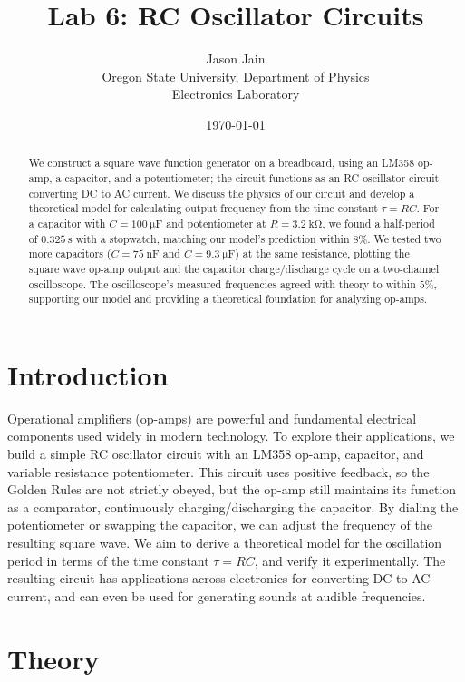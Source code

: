\documentclass[11pt]{article}
\title{Lab 6: RC Oscillator Circuits}
\author{Jason Jain \\
        Oregon State University, Department of Physics \\
        Electronics Laboratory}
\date{\today}
\begin{document}
\maketitle


\begin{abstract}
        We construct a square wave function generator on a breadboard, using an LM358 op-amp, a capacitor, and a potentiometer; the circuit functions as an RC oscillator circuit converting DC to AC current. We discuss the physics of our circuit and develop a theoretical model for calculating output frequency from the time constant $\tau=RC$. For a capacitor with $C=\qty{100}{\micro\farad}$ and potentiometer at $R=\qty{3.2}{\kilo\ohm}$, we found a half-period of $\qty{0.325}{\s}$ with a stopwatch, matching our model's prediction within 8\%. We tested two more capacitors ($C=\qty{75}{\nano\farad}$ and $C=\qty{9.3}{\micro\farad}$) at the same resistance, plotting the square wave op-amp output and the capacitor charge/discharge cycle on a two-channel oscilloscope. The oscilloscope's measured frequencies agreed with theory to within $5\%$, supporting our model and providing a theoretical foundation for analyzing op-amps.
\end{abstract}


\section{Introduction}

Operational amplifiers (op-amps) are powerful and fundamental electrical components used widely in modern technology. To explore their applications, we build a simple RC oscillator circuit with an LM358 op-amp, capacitor, and variable resistance potentiometer. This circuit uses positive feedback, so the Golden Rules are not strictly obeyed, but the op-amp still maintains its function as a comparator, continuously charging/discharging the capacitor. By dialing the potentiometer or swapping the capacitor, we can adjust the frequency of the resulting square wave. We aim to derive a theoretical model for the oscillation period in terms of the time constant $\tau=RC$, and verify it experimentally. The resulting circuit has applications across electronics for converting DC to AC current, and can even be used for generating sounds at audible frequencies.


\section{Theory}
\end{document}
